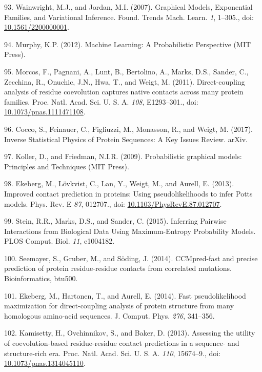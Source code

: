 \documentclass[11pt,a4paper,twoside]{book}
\theoremstyle{definition}
\theoremstyle{definition}
\theoremstyle{remark}
\begin{document}
\hypertarget{ref-Wainwright2007}{}
93. Wainwright, M.J., and Jordan, M.I. (2007). Graphical Models,
Exponential Families, and Variational Inference. Found. Trends Mach.
Learn. \emph{1}, 1--305., doi:
\href{https://doi.org/10.1561/2200000001}{10.1561/2200000001}.

\hypertarget{ref-Murphy2012}{}
94. Murphy, K.P. (2012). Machine Learning: A Probabilistic Perspective
(MIT Press).

\hypertarget{ref-Morcos2011}{}
95. Morcos, F., Pagnani, A., Lunt, B., Bertolino, A., Marks, D.S.,
Sander, C., Zecchina, R., Onuchic, J.N., Hwa, T., and Weigt, M. (2011).
Direct-coupling analysis of residue coevolution captures native contacts
across many protein families. Proc. Natl. Acad. Sci. U. S. A.
\emph{108}, E1293--301., doi:
\href{https://doi.org/10.1073/pnas.1111471108}{10.1073/pnas.1111471108}.

\hypertarget{ref-Cocco2017}{}
96. Cocco, S., Feinauer, C., Figliuzzi, M., Monasson, R., and Weigt, M.
(2017). Inverse Statistical Physics of Protein Sequences: A Key Issues
Review. arXiv.

\hypertarget{ref-Koller2009}{}
97. Koller, D., and Friedman, N.I.R. (2009). Probabilistic graphical
models: Principles and Techniques (MIT Press).

\hypertarget{ref-Ekeberg2013}{}
98. Ekeberg, M., Lövkvist, C., Lan, Y., Weigt, M., and Aurell, E.
(2013). Improved contact prediction in proteins: Using pseudolikelihoods
to infer Potts models. Phys. Rev. E \emph{87}, 012707., doi:
\href{https://doi.org/10.1103/PhysRevE.87.012707}{10.1103/PhysRevE.87.012707}.

\hypertarget{ref-Stein2015a}{}
99. Stein, R.R., Marks, D.S., and Sander, C. (2015). Inferring Pairwise
Interactions from Biological Data Using Maximum-Entropy Probability
Models. PLOS Comput. Biol. \emph{11}, e1004182.

\hypertarget{ref-Seemayer2014}{}
100. Seemayer, S., Gruber, M., and Söding, J. (2014). CCMpred-fast and
precise prediction of protein residue-residue contacts from correlated
mutations. Bioinformatics, btu500.

\hypertarget{ref-Ekeberg2014}{}
101. Ekeberg, M., Hartonen, T., and Aurell, E. (2014). Fast
pseudolikelihood maximization for direct-coupling analysis of protein
structure from many homologous amino-acid sequences. J. Comput. Phys.
\emph{276}, 341--356.

\hypertarget{ref-Kamisetty2013}{}
102. Kamisetty, H., Ovchinnikov, S., and Baker, D. (2013). Assessing the
utility of coevolution-based residue-residue contact predictions in a
sequence- and structure-rich era. Proc. Natl. Acad. Sci. U. S. A.
\emph{110}, 15674--9., doi:
\href{https://doi.org/10.1073/pnas.1314045110}{10.1073/pnas.1314045110}.
\end{document}
